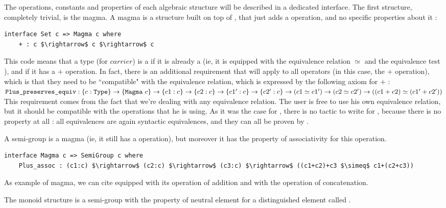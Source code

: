 The operations, constants and properties of each algebraic structure will be described in a dedicated interface. The first structure, completely trivial, is the magma. A magma is a structure built on top of , that just adds a  operation, and no specific properties about it :

\begin{lstlisting}
interface Set c => Magma c where
    + : c $\rightarrow$ c $\rightarrow$ c
\end{lstlisting}

This code means that a type  (for $carrier$) is a  if it is already a  (ie, it is equipped with the equivalence relation $\simeq$ and the equivalence test ), and if it has a $+$ operation.
In fact, there is an additional requirement that will apply to all operators (in this case, the $+$ operation), which is that they need to be ``compatible" with the equivalence relation, which is expressed by the following axiom for $+$ : \\ ${\mbox{\texttt{Plus\_preserves\_equiv}}} : \{c:{\mbox{\texttt{Type}}}\} \rightarrow \{{\mbox{\texttt{Magma}}}\ c\} \rightarrow\{c1:c\} \rightarrow \{c2:c\} \rightarrow \{c1':c\} \rightarrow \{c2':c\} \rightarrow (c1 \simeq c1') \rightarrow (c2 \simeq c2') \rightarrow ((c1+c2) \simeq (c1'+c2'))$ \\ 
This requirement comes from the fact that we're dealing with any equivalence relation. The user is free to use his own equivalence relation, but it should be compatible with the operations that he is using.
As it was the case for , there is no tactic to write for , because there is no property at all : all equivalences are again syntactic equivalences, and they can all be proven by . 

A semi-group is a magma (ie, it still has a  operation), but moreover it has the property of associativity for this operation. 

\begin{lstlisting}
interface Magma c => SemiGroup c where
    Plus_assoc : (c1:c) $\rightarrow$ (c2:c) $\rightarrow$ (c3:c) $\rightarrow$ ((c1+c2)+c3 $\simeq$ c1+(c2+c3))
\end{lstlisting}

As example of magma, we can cite  equipped with its operation of addition and  with the operation of concatenation.

The monoid structure is a semi-group with the property of neutral element for a distinguished element called .

